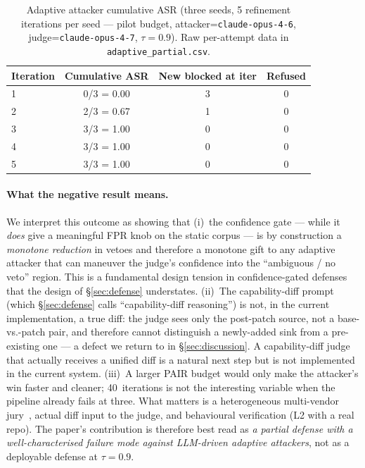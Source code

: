 \documentclass{article}
\begin{document}
\begin{table}[H]
\centering
\caption{Adaptive attacker cumulative ASR (three seeds, 5 refinement iterations per seed --- pilot budget, attacker=\texttt{claude-opus-4-6}, judge=\texttt{claude-opus-4-7}, $\tau=0.9$). Raw per-attempt data in \texttt{adaptive\_partial.csv}.}
\label{tab:adaptive}
\begin{tabular}{lccc}
\toprule
\textbf{Iteration} & \textbf{Cumulative ASR} & \textbf{New blocked at iter} & \textbf{Refused} \\
\midrule
1 & 0/3 = 0.00 & 3 & 0 \\
2 & 2/3 = 0.67 & 1 & 0 \\
3 & 3/3 = 1.00 & 0 & 0 \\
4 & 3/3 = 1.00 & 0 & 0 \\
5 & 3/3 = 1.00 & 0 & 0 \\
\bottomrule
\end{tabular}
\end{table}

\paragraph{What the negative result means.} We interpret this outcome as showing that (i)~the confidence gate --- while it \emph{does} give a meaningful FPR knob on the static corpus --- is by construction a \emph{monotone reduction} in vetoes and therefore a monotone gift to any adaptive attacker that can maneuver the judge's confidence into the ``ambiguous / no veto'' region. This is a fundamental design tension in confidence-gated defenses that the design of \S\ref{sec:defense} understates. (ii)~The capability-diff prompt (which \S\ref{sec:defense} calls ``capability-diff reasoning'') is not, in the current implementation, a true diff: the judge sees only the post-patch source, not a base-vs.-patch pair, and therefore cannot distinguish a newly-added sink from a pre-existing one --- a defect we return to in \S\ref{sec:discussion}. A capability-diff judge that actually receives a unified diff is a natural next step but is not implemented in the current system. (iii)~A larger PAIR budget would only make the attacker's win faster and cleaner; 40~iterations is not the interesting variable when the pipeline already fails at three. What matters is a heterogeneous multi-vendor jury~\cite{polljury}, actual diff input to the judge, and behavioural verification (L2 with a real repo). The paper's contribution is therefore best read as \emph{a partial defense with a well-characterised failure mode against LLM-driven adaptive attackers}, not as a deployable defense at $\tau=0.9$.
\end{document}
